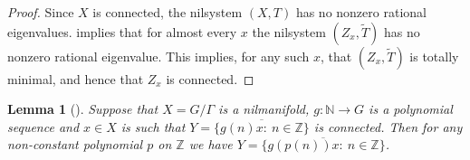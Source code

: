 \documentclass{article}
\theoremstyle{plain}
\newtheorem{lemma}[Theorem]{Lemma}
\theoremstyle{claim}
\theoremstyle{definition}
\theoremstyle{plain}
\theoremstyle{plain}
\newcommand{\N}{\mathbb{N}}
\newcommand{\Z}{\mathbb{Z}}
\newcommand{\1}{\boldsymbol{1}}
\begin{document}
\begin{proof}
    Since $X$ is connected, the nilsystem $(X,T)$ has no nonzero rational eigenvalues. 
    \cite[Revised Theorem 7.1]{Moreira_Richter24} implies that for almost every $x$ the nilsystem $(Z_x,\tilde T)$ has no nonzero rational eigenvalue.
    This implies, for any such $x$, that $(Z_x,\tilde T)$ is totally minimal, and hence that $Z_x$ is connected.
\end{proof}


\begin{lemma}[{\cite[Proposition 2.7]{Frantzikinakis08}}]
\label{lem:frantzikinakis_connected}
Suppose that $X = G/\Gamma$ is a nilmanifold, $g: \N \to G$ is a polynomial sequence and $x \in X$ is such that $Y = \overline{\{g(n) x: \ n \in \Z\}}$ is connected. Then for any non-constant polynomial $p$ on $\Z$ we have $Y = \overline{\{g(p(n)) x: \ n \in \Z\}}$.
\end{lemma}
\end{document}
